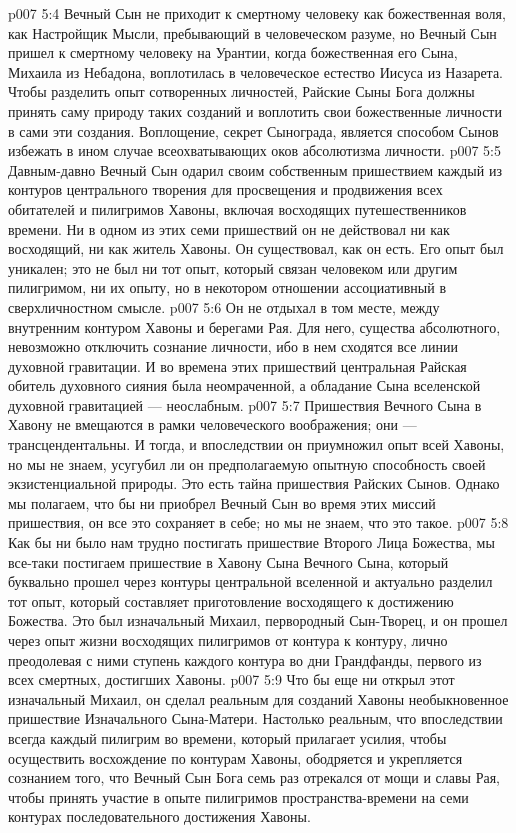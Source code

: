 \vs p007 5:4 Вечный Сын не приходит к смертному человеку как божественная воля, как Настройщик Мысли, пребывающий в человеческом разуме, но Вечный Сын пришел к смертному человеку на Урантии, когда божественная  его Сына, Михаила из Небадона, воплотилась в человеческое естество Иисуса из Назарета. Чтобы разделить опыт сотворенных личностей, Райские Сыны Бога должны принять саму природу таких созданий и воплотить свои божественные личности в сами эти создания. Воплощение, секрет Сынограда, является способом Сынов избежать в ином случае всеохватывающих оков абсолютизма личности.
\vs p007 5:5 \pc Давным\hyp{}давно Вечный Сын одарил своим собственным пришествием каждый из контуров центрального творения для просвещения и продвижения всех обитателей и пилигримов Хавоны, включая восходящих путешественников времени. Ни в одном из этих семи пришествий он не действовал ни как восходящий, ни как житель Хавоны. Он существовал, как он есть. Его опыт был уникален; это не был ни тот опыт, который связан  человеком или другим пилигримом, ни  их опыту, но в некотором отношении ассоциативный в сверхличностном смысле.
\vs p007 5:6 Он не отдыхал в том месте, между внутренним контуром Хавоны и берегами Рая. Для него, существа абсолютного, невозможно отключить сознание личности, ибо в нем сходятся все линии духовной гравитации. И во времена этих пришествий центральная Райская обитель духовного сияния была неомраченной, а обладание Сына вселенской духовной гравитацией --- неослабным.
\vs p007 5:7 \pc Пришествия Вечного Сына в Хавону не вмещаются в рамки человеческого воображения; они --- трансцендентальны. И тогда, и впоследствии он приумножил опыт всей Хавоны, но мы не знаем, усугубил ли он предполагаемую опытную способность своей экзистенциальной природы. Это есть тайна пришествия Райских Сынов. Однако мы полагаем, что бы ни приобрел Вечный Сын во время этих миссий пришествия, он все это сохраняет в себе; но мы не знаем, что это такое.
\vs p007 5:8 \pc Как бы ни было нам трудно постигать пришествие Второго Лица Божества, мы все\hyp{}таки постигаем пришествие в Хавону Сына Вечного Сына, который буквально прошел через контуры центральной вселенной и актуально разделил тот опыт, который составляет приготовление восходящего к достижению Божества. Это был изначальный Михаил, первородный Сын\hyp{}Творец, и он прошел через опыт жизни восходящих пилигримов от контура к контуру, лично преодолевая с ними ступень каждого контура во дни Грандфанды, первого из всех смертных, достигших Хавоны.
\vs p007 5:9 Что бы еще ни открыл этот изначальный Михаил, он сделал реальным для созданий Хавоны необыкновенное пришествие Изначального Сына\hyp{}Матери. Настолько реальным, что впоследствии всегда каждый пилигрим во времени, который прилагает усилия, чтобы осуществить восхождение по контурам Хавоны, ободряется и укрепляется сознанием того, что Вечный Сын Бога семь раз отрекался от мощи и славы Рая, чтобы принять участие в опыте пилигримов пространства\hyp{}времени на семи контурах последовательного достижения Хавоны.
